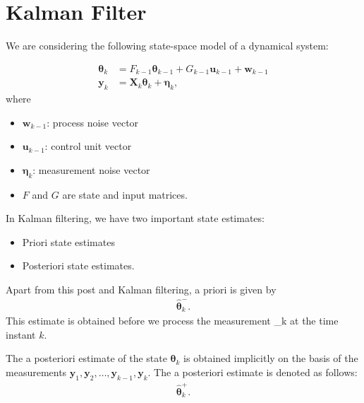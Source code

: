 \section{Kalman Filter}
\label{sec:advanced_kalman}


We are considering the following state-space model of a dynamical system:

\begin{align*}
	\boldsymbol{\theta}_{k}&=F_{k-1}\boldsymbol{\theta}_{k-1}+G_{k-1}\mathbf{u}_{k-1}+\mathbf{w}_{k-1} \\
	\mathbf{y}_{k}& = \mathbf{X}_{k}\boldsymbol{\theta}_{k}+\boldsymbol{\eta}_{k},
\end{align*}
where
\begin{itemize}
	\item $\mathbf{w}_{k-1}$: process noise vector
	\item $\mathbf{u}_{k-1}$: control unit vector
	\item $\boldsymbol{\eta}_{k}$: measurement noise vector
	\item $F$ and $G$ are state and input matrices.
\end{itemize}


In Kalman filtering, we have two important state estimates: 
\begin{itemize}
	\item Priori state estimates
	\item Posteriori state estimates. 
\end{itemize}
Apart from this post and Kalman filtering, a priori is given by
\begin{align*}
	\hat{\boldsymbol{\theta}}_{k}^{-}.
\end{align*}
This estimate is obtained before we process the measurement _{k} at the time instant $k$.

The a posteriori estimate of the state $\boldsymbol{\theta}_{k}$ is obtained implicitly on the basis of the measurements $\mathbf{y}_{1},\mathbf{y}_{2},\ldots, \mathbf{y}_{k-1},\mathbf{y}_{k}$. The a posteriori estimate is denoted as follows:
\begin{align*}
	\hat{\boldsymbol{\theta}}_{k}^{+}.
\end{align*}

